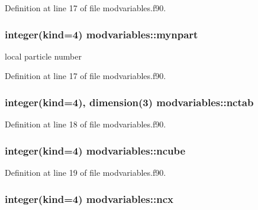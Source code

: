 Definition at line 17 of file modvariables.\+f90.

\subsubsection[{\texorpdfstring{mynpart}{mynpart}}]{\setlength{\rightskip}{0pt plus 5cm}integer(kind=4) modvariables\+::mynpart}\hypertarget{namespacemodvariables_a6b2f4aac9da282a26d2ff36628fa0c7b}{}\label{namespacemodvariables_a6b2f4aac9da282a26d2ff36628fa0c7b}


local particle number 



Definition at line 17 of file modvariables.\+f90.

\subsubsection[{\texorpdfstring{nctab}{nctab}}]{\setlength{\rightskip}{0pt plus 5cm}integer(kind=4), dimension(3) modvariables\+::nctab}\hypertarget{namespacemodvariables_a0a00ccc148897945f3defb5f775e4c18}{}\label{namespacemodvariables_a0a00ccc148897945f3defb5f775e4c18}


Definition at line 18 of file modvariables.\+f90.

\subsubsection[{\texorpdfstring{ncube}{ncube}}]{\setlength{\rightskip}{0pt plus 5cm}integer(kind=4) modvariables\+::ncube}\hypertarget{namespacemodvariables_ab094334ab9c4ab8644017abf18dcd25f}{}\label{namespacemodvariables_ab094334ab9c4ab8644017abf18dcd25f}


Definition at line 19 of file modvariables.\+f90.

\subsubsection[{\texorpdfstring{ncx}{ncx}}]{\setlength{\rightskip}{0pt plus 5cm}integer(kind=4) modvariables\+::ncx}\hypertarget{namespacemodvariables_ab3c5e83108d2cc8318f235c1f889a162}{}\label{namespacemodvariables_ab3c5e83108d2cc8318f235c1f889a162}


